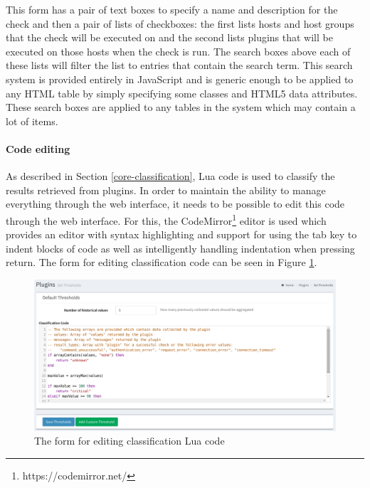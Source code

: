 \documentclass[bsc,deptreport,twoside,parskip,singlespacing,notimes]{infthesis}
\begin{document}
	This form has a pair of text boxes to specify a name and description for the
	check and then a pair of lists of checkboxes: the first lists hosts and host
	groups that the check will be executed on and the second lists plugins that
	will be executed on those hosts when the check is run.  The search boxes above
	each of these lists will filter the list to entries that contain the search
	term. This search system is provided entirely in JavaScript and is generic
	enough to be applied to any HTML table by simply specifying some classes and
	HTML5 data attributes.  These search boxes are applied to any tables in the
	system which may contain a lot of items.

\paragraph*{Code editing}
	As described in Section \ref{core-classification}, Lua code is used to classify
	the results retrieved from plugins.  In order to maintain the ability to manage
	everything through the web interface, it needs to be possible to edit this code
	through the web interface.  For this, the
	CodeMirror\footnote{https://codemirror.net/} editor is used which provides an
	editor with syntax highlighting and support for using the tab key to indent
	blocks of code as well as intelligently handling indentation when pressing
	return.  The form for editing classification code can be seen in Figure
	\ref{set-thresholds}.

\begin{figure}[H]
	\caption{The form for editing classification Lua code}
	\label{set-thresholds}
	\includegraphics[scale=0.45]{assets/screenshots/set-thresholds.pdf}
\end{figure}
\end{document}
